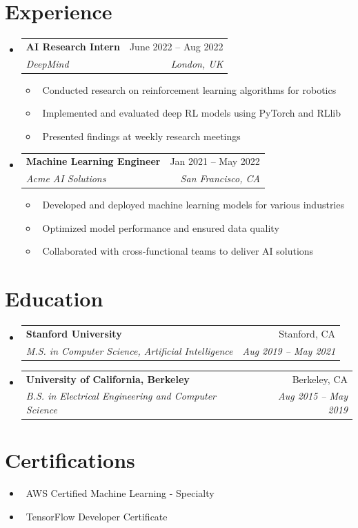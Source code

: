 \documentclass[letterpaper,10pt]{article}
\makeatletter
\newcommand{\resumeItem}[1]{\item\small{#1}}
\newcommand{\resumeSubheading}[4]{
\vspace{-1pt}\item
  \begin{tabular*}{0.97\textwidth}[t]{l@{\extracolsep{\fill}}r}
    \textbf{#1} & #2 \\
    \textit{#3} & \textit{#4} \\
  \end{tabular*}\vspace{-7pt}
}
\newcommand{\resumeSubHeadingList}{\begin{itemize}[leftmargin=0.15in, label={}]}
\newcommand{\resumeSubHeadingListEnd}{\end{itemize}}
\makeatother
\begin{document}
\section{Experience}
\resumeSubHeadingList
  \resumeSubheading
      {AI Research Intern}{June 2022 -- Aug 2022}
      {DeepMind}{London, UK}
      \resumeSubHeadingList
          \resumeItem{\textbullet\ Conducted research on reinforcement learning algorithms for robotics}
          \resumeItem{\textbullet\ Implemented and evaluated deep RL models using PyTorch and RLlib}
          \resumeItem{\textbullet\ Presented findings at weekly research meetings}
      \resumeSubHeadingListEnd
  \resumeSubheading
      {Machine Learning Engineer}{Jan 2021 -- May 2022}
      {Acme AI Solutions}{San Francisco, CA}
      \resumeSubHeadingList
          \resumeItem{\textbullet\ Developed and deployed machine learning models for various industries}
          \resumeItem{\textbullet\ Optimized model performance and ensured data quality}
          \resumeItem{\textbullet\ Collaborated with cross-functional teams to deliver AI solutions}
      \resumeSubHeadingListEnd
\resumeSubHeadingListEnd

\section{Education}
\resumeSubHeadingList
  \resumeSubheading
      {Stanford University}{Stanford, CA}
      {M.S. in Computer Science, Artificial Intelligence}{Aug 2019 -- May 2021}
  \resumeSubheading
      {University of California, Berkeley}{Berkeley, CA}
      {B.S. in Electrical Engineering and Computer Science}{Aug 2015 -- May 2019}
\resumeSubHeadingListEnd

\section{Certifications}
\resumeSubHeadingList
  \resumeItem{\textbullet\ AWS Certified Machine Learning - Specialty}
  \resumeItem{\textbullet\ TensorFlow Developer Certificate}
\resumeSubHeadingListEnd
\end{document}
